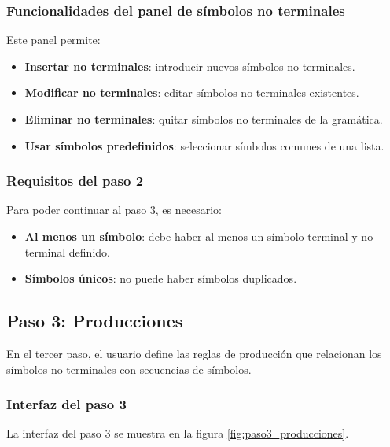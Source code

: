 \subsubsection{Funcionalidades del panel de símbolos no terminales}

Este panel permite:
\begin{itemize}
    \item \textbf{Insertar no terminales}: introducir nuevos símbolos no terminales.
    \item \textbf{Modificar no terminales}: editar símbolos no terminales existentes.
    \item \textbf{Eliminar no terminales}: quitar símbolos no terminales de la gramática.
    \item \textbf{Usar símbolos predefinidos}: seleccionar símbolos comunes de una lista.
\end{itemize}

\subsubsection{Requisitos del paso 2}

Para poder continuar al paso 3, es necesario:

\begin{itemize}
    \item \textbf{Al menos un símbolo}: debe haber al menos un símbolo terminal y no terminal definido.
    \item \textbf{Símbolos únicos}: no puede haber símbolos duplicados.
\end{itemize}

\subsection{Paso 3: Producciones}

En el tercer paso, el usuario define las reglas de producción que relacionan los símbolos no terminales con secuencias de símbolos.

\subsubsection{Interfaz del paso 3}

La interfaz del paso 3 se muestra en la figura \ref{fig:paso3_producciones}.

